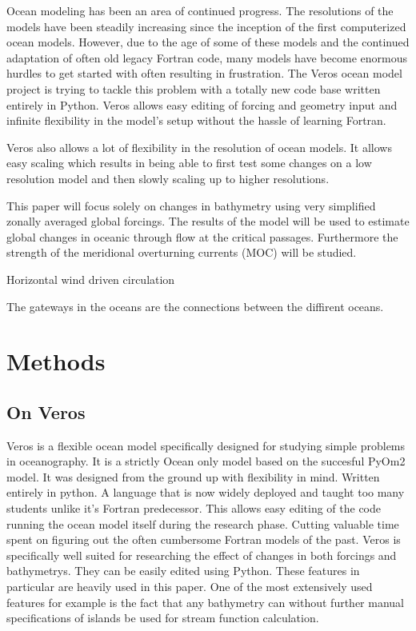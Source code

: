 \documentclass[a4paper]{article}
\begin{document}
\begin{multicols}{2}
Ocean modeling has been an area of continued progress. The resolutions of the models have been steadily increasing since the inception of the first computerized ocean models. However, due to the age of some of these models and the continued adaptation of often old legacy Fortran code, many models have become enormous hurdles to get started with often resulting in frustration. The Veros\cite{Hafner2018Aug} ocean model project is trying to tackle this problem with a totally new code base written entirely in Python. Veros allows easy editing of forcing and geometry input and infinite flexibility in the model's setup without the hassle of learning Fortran.

Veros also allows a lot of flexibility in the resolution of ocean models. It allows easy scaling which results in being able to first test some changes on a low resolution model and then slowly scaling up to higher resolutions.

This paper will focus solely on changes in bathymetry using very simplified zonally averaged global forcings. The results of the model will be used to estimate global changes in oceanic through flow at the critical passages. Furthermore the strength of the meridional overturning currents (MOC) will be studied.

Horizontal wind driven circulation

The gateways in the oceans are the connections between the diffirent oceans. 


\section{Methods}
\subsection{On Veros}
Veros is a flexible ocean model specifically designed for studying simple problems in oceanography. It is a strictly Ocean only model based on the succesful PyOm2 model. It was designed from the ground up with flexibility in mind. Written entirely in python. A language that is now widely deployed and taught too many students unlike it's Fortran predecessor. This allows easy editing of the code running the ocean model itself during the research phase. Cutting valuable time spent on figuring out the often cumbersome Fortran models of the past. Veros is specifically well suited for researching the effect of changes in both forcings and bathymetrys. They can be easily edited using Python. These features in particular are heavily used in this paper. One of the most extensively used features for example is the fact that any bathymetry can without further manual specifications of islands be used for stream function calculation.


\end{multicols}
\end{document}
